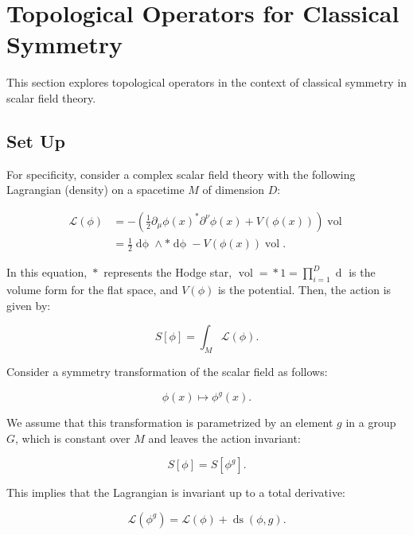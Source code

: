 \documentclass[11pt,toc=bibliography]{scrbook}
\DeclareMathOperator{\vol}{vol}
\newcommand{\stdim}{D}
\numberwithin{equation}{section}
\begin{document}
\chapter{Topological Operators for Classical Symmetry}
\label{sec-scalar}

This section explores topological operators in the context of classical symmetry in scalar field theory.

\section{Set Up}
For specificity, consider a complex scalar field theory with the following Lagrangian (density) on a spacetime $M$ of dimension $\stdim$:

\begin{equation}
\begin{aligned}
\mathcal{L}(\phi) &=  - \left(\frac12 \partial_\mu \phi(x)^* \partial^\nu \phi(x) + V(\phi(x))\right)\vol\\
&= \frac{1}{2} \mathop{d\phi} \wedge *\mathop{d\phi} - V(\phi(x))\vol.
\end{aligned}
\end{equation}

In this equation, $\mathop{*}$ represents the Hodge star, $\vol = \mathop{*} 1 = \prod_{i=1}^{\stdim} \mathop{dx_i}$ is the volume form for the flat space, and $V(\phi)$ is the potential. Then, the action is given by:

\begin{equation}
S[\phi] = \int_{M}\mathcal{L}(\phi).
\end{equation}

Consider a symmetry transformation of the scalar field as follows:

\begin{equation}
\phi(x) \mapsto \phi^g(x).
\label{eq-scalar-transf}
\end{equation}

We assume that this transformation is parametrized by an element $g$ in a group $G$, which is constant over $M$ and leaves the action invariant:

\begin{equation}
S[\phi]=S[\phi^g].
\label{eq-action-inv}
\end{equation}

This implies that the Lagrangian is invariant up to a total derivative:

\begin{equation}
\mathcal{L}(\phi^g) = \mathcal{L}(\phi) + \mathop{ds}(\phi,g).
\label{eq-Lagrangian-inv}
\end{equation}
\end{document}
